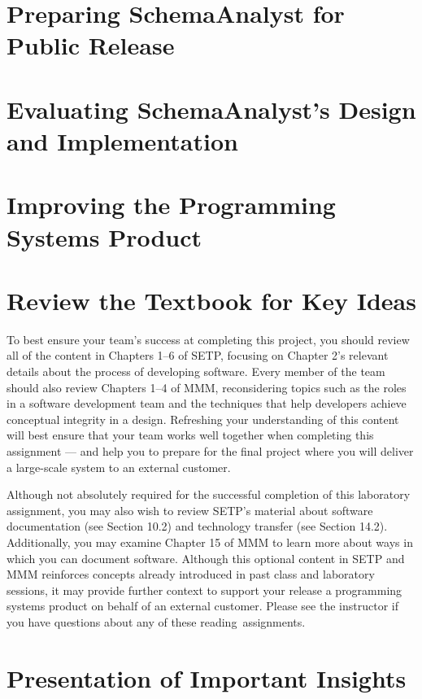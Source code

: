 \section*{Preparing SchemaAnalyst for Public Release}

\section*{Evaluating SchemaAnalyst's Design and Implementation}

\section*{Improving the Programming Systems Product}

\section*{Review the Textbook for Key Ideas}

To best ensure your team's success at completing this project, you should review all of the content in Chapters 1--6 of
SETP, focusing on Chapter 2's relevant details about the process of developing software. Every member of the team should
also review Chapters 1--4 of MMM, reconsidering topics such as the roles in a software development team and the
techniques that help developers achieve conceptual integrity in a design. Refreshing your understanding of this content
will best ensure that your team works well together when completing this assignment --- and help you to prepare for the
final project where you will deliver a large-scale system to an external customer.

Although not absolutely required for the successful completion of this laboratory assignment, you may also wish to
review SETP's material about software documentation (see Section 10.2) and technology transfer (see Section 14.2).
Additionally, you may examine Chapter 15 of MMM to learn more about ways in which you can document software. Although
this optional content in SETP and MMM reinforces concepts already introduced in past class and laboratory sessions, it
may provide further context to support your release a programming systems product on behalf of an external customer.
Please see the instructor if you have questions about any of these \mbox{reading assignments}.

\section*{Presentation of Important Insights}

